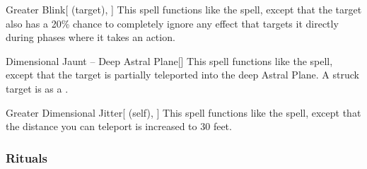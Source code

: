 \lowercase{\hypertarget{spell:Greater Blink}{}}\label{spell:Greater Blink}
\begin{attuneability}[\nth{6}]{\hypertarget{spell:Greater Blink}{Greater Blink}}[ (target), ]
This spell functions like the  spell, except that the target also has a 20\% chance to completely ignore any effect that targets it directly during phases where it takes an action.
\end{attuneability}
\vspace{0.25em}



\lowercase{\hypertarget{spell:Dimensional Jaunt -- Deep Astral Plane}{}}\label{spell:Dimensional Jaunt -- Deep Astral Plane}
\begin{freeability}[\nth{7}]{\hypertarget{spell:Dimensional Jaunt -- Deep Astral Plane}{Dimensional Jaunt -- Deep Astral Plane}}[]
This spell functions like the  spell, except that the target is partially teleported into the deep Astral Plane.
A struck target is  as a .
\end{freeability}
\vspace{0.25em}



\lowercase{\hypertarget{spell:Greater Dimensional Jitter}{}}\label{spell:Greater Dimensional Jitter}
\begin{attuneability}[\nth{7}]{\hypertarget{spell:Greater Dimensional Jitter}{Greater Dimensional Jitter}}[ (self), ]
This spell functions like the  spell, except that the distance you can teleport is increased to 30 feet.
\end{attuneability}
\vspace{0.25em}



\subsubsection{Rituals}


